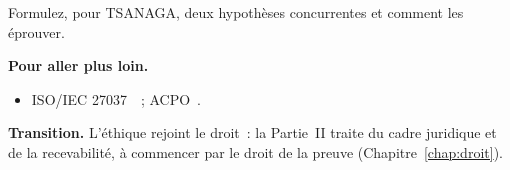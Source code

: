 \begin{boxexo}[title={\ding{45}\quad Exercice~3.10. Hypothèses \niveauexpert}]
Formulez, pour TSANAGA, deux hypothèses concurrentes et comment les éprouver.
\end{boxexo}

\bigskip

\begin{boxinfo}
\textbf{Pour aller plus loin.}
\begin{itemize}
    \item ISO/IEC 27037~\cite{iso27037}~; ACPO~\cite{acpo2012}.
\end{itemize}
\end{boxinfo}

\begin{boxinfo}
\textbf{Transition.} L'éthique rejoint le droit~: la Partie~II traite du
cadre juridique et de la recevabilité, à commencer par le droit de la preuve
(Chapitre~\ref{chap:droit}).
\end{boxinfo}
